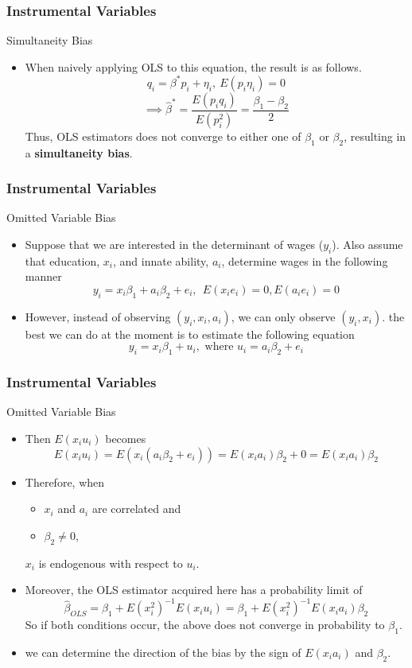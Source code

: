 \documentclass{beamer}
\begin{document}
\begin{frame}
\frametitle{Instrumental Variables}
Simultaneity Bias
\begin{itemize}
\item When naively applying OLS to this equation, the result is as follows. 
\[
q_i=\beta^*p_i+\eta_i, \ E(p_i\eta_i)=0 
\]
\[
\implies \hat{\beta}^*=\frac{E(p_iq_i)}{E(p_i^2)}=\frac{\beta_1-\beta_2}{2}
\]
Thus, OLS estimators does not converge to either one of $\beta_1$ or $\beta_2$, resulting in a \textbf{simultaneity bias}.  
\end{itemize}
\end{frame}

\begin{frame}
\frametitle{Instrumental Variables}
Omitted Variable Bias
\begin{itemize}
\item Suppose that we are interested in the determinant of wages ($y_i$). Also assume that education, $x_i$, and innate ability,  $a_i$, determine wages in the following manner
\[
y_ i = x_i\beta_1+a_i\beta_2+e_i, \ \ E(x_ie_i)=0, E(a_ie_i)=0
\]
\item However, instead of observing $(y_i,x_i,a_i)$, we can only observe $(y_i, x_i)$. the best we can do at the moment is to estimate the following equation
\[
y_i=x_i\beta_1+u_i,\text{ where } u_i=a_i\beta_2 + e_i
\] 
\end{itemize}
\end{frame}

\begin{frame}
\frametitle{Instrumental Variables}
Omitted Variable Bias
\begin{itemize}
\item Then $E(x_iu_i)$ becomes
\[
E(x_iu_i)= E(x_i(a_i\beta_2+e_i))=E(x_ia_i)\beta_2+0 = E(x_ia_i)\beta_2
\]
\item Therefore, when 
\begin{itemize}
\item $x_i$ and $a_i$ are correlated and 
\item $\beta_2\neq0$,
\end{itemize}
 $x_i$ is endogenous with respect to $u_i$. 
 \item Moreover, the OLS estimator acquired here has a probability limit of
\[
\hat{\beta}_{OLS}=\beta_1+E(x_i^2)^{-1}E(x_iu_i)=\beta_1+E(x_i^2)^{-1}E(x_ia_i)\beta_2
\]
So if both conditions occur, the above does not converge in probability to $\beta_1$. 
\item we can determine the direction of the bias by the sign of $E(x_ia_i)$ and $\beta_2$. 
\end{itemize}
\end{frame}
\end{document}
